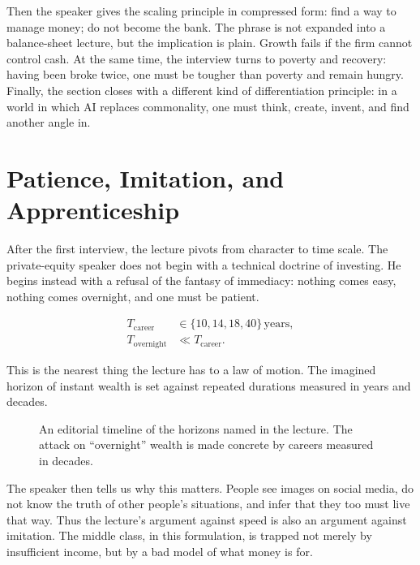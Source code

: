 Then the speaker gives the scaling principle in compressed form: find a way to manage money; do not become the bank. The phrase is not expanded into a balance-sheet lecture, but the implication is plain. Growth fails if the firm cannot control cash. At the same time, the interview turns to poverty and recovery: having been broke twice, one must be tougher than poverty and remain hungry. Finally, the section closes with a different kind of differentiation principle: in a world in which AI replaces commonality, one must think, create, invent, and find another angle in.

\section{Patience, Imitation, and Apprenticeship}

After the first interview, the lecture pivots from character to time scale. The private-equity speaker does not begin with a technical doctrine of investing. He begins instead with a refusal of the fantasy of immediacy: nothing comes easy, nothing comes overnight, and one must be patient.

\begin{align}
T_{\mathrm{career}} &\in \{10,14,18,40\}\,\text{years},\\
T_{\mathrm{overnight}} &\ll T_{\mathrm{career}}.
\end{align}

This is the nearest thing the lecture has to a law of motion. The imagined horizon of instant wealth is set against repeated durations measured in years and decades.

\begin{figure}[h]
\centering
{}
\caption{An editorial timeline of the horizons named in the lecture. The attack on ``overnight'' wealth is made concrete by careers measured in decades.}
\end{figure}

The speaker then tells us why this matters. People see images on social media, do not know the truth of other people's situations, and infer that they too must live that way. Thus the lecture's argument against speed is also an argument against imitation. The middle class, in this formulation, is trapped not merely by insufficient income, but by a bad model of what money is for.

